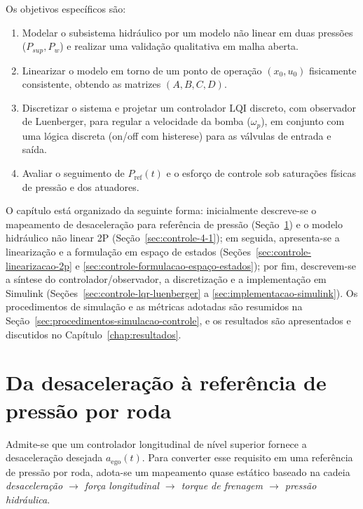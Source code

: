 Os objetivos específicos são:
\begin{enumerate}
    \item Modelar o subsistema hidráulico por um modelo não linear em duas pressões ($P_{sup},P_w$) e realizar uma validação qualitativa em malha aberta.
    \item Linearizar o modelo em torno de um ponto de operação $(x_0,u_0)$ fisicamente consistente, obtendo as matrizes $(A,B,C,D)$.
    \item Discretizar o sistema e projetar um controlador LQI discreto, com observador de Luenberger, para regular a velocidade da bomba ($\omega_p$), em conjunto com uma lógica discreta (on/off com histerese) para as válvulas de entrada e saída.
    \item Avaliar o seguimento de $P_{\mathrm{ref}}(t)$ e o esforço de controle sob saturações físicas de pressão e dos atuadores.
\end{enumerate}

O capítulo está organizado da seguinte forma: inicialmente descreve-se o mapeamento de desaceleração para referência de pressão (Seção~\ref{sec:mapeamento-aref-pressao}) e o modelo hidráulico não linear 2P (Seção~\ref{sec:controle-4-1}); em seguida, apresenta-se a linearização e a formulação em espaço de estados (Seções~\ref{sec:controle-linearizacao-2p} e \ref{sec:controle-formulacao-espaço-estados}); por fim, descrevem-se a síntese do controlador/observador, a discretização e a implementação em Simulink (Seções~\ref{sec:controle-lqr-luenberger} a \ref{sec:implementacao-simulink}). Os procedimentos de simulação e as métricas adotadas são resumidos na Seção~\ref{sec:procedimentos-simulacao-controle}, e os resultados são apresentados e discutidos no Capítulo~\ref{chap:resultados}.


\section{Da desaceleração à referência de pressão por roda}
\label{sec:mapeamento-aref-pressao}
Admite-se que um controlador longitudinal de nível superior fornece a desaceleração desejada $a_{\mathrm{ego}}(t)$. Para converter esse requisito em uma referência de pressão por roda, adota-se um mapeamento quase estático baseado na cadeia
\emph{desaceleração $\rightarrow$ força longitudinal $\rightarrow$ torque de frenagem $\rightarrow$ pressão hidráulica}.

